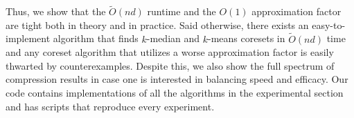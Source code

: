Thus, we show that the $\tilde{O}(nd)$ runtime and the $O(1)$ approximation factor are tight both in theory and in practice.
Said otherwise, there exists an easy-to-implement algorithm that finds $k$-median and $k$-means coresets in $\tilde{O}(nd)$ time and any coreset
algorithm that utilizes a worse approximation factor is easily thwarted by counterexamples. Despite this, we also show the full spectrum of compression results
in case one is interested in balancing speed and efficacy. Our code contains implementations of all the algorithms in the experimental section and has scripts
that reproduce every experiment.
